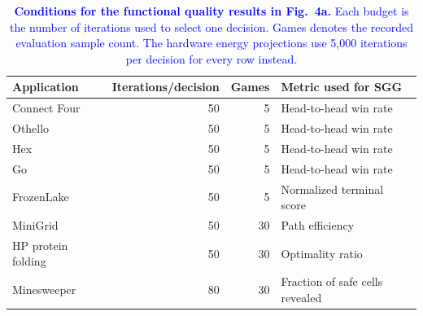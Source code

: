\begin{table}[!htbp]
\centering
\caption{\textcolor{blue}{\textbf{Conditions for the functional quality results in Fig.~4a.} Each budget is the number of iterations used to select one decision. Games denotes the recorded evaluation sample count. The hardware energy projections use 5{,}000 iterations per decision for every row instead.}}
\label{supp:application_protocol}
\begingroup\color{blue}\footnotesize
\begin{tabular}{l r r l}
\toprule
\textbf{Application} & \textbf{Iterations/decision} & \textbf{Games} & \textbf{Metric used for SGG} \\
\midrule
Connect Four & 50 & 5 & Head-to-head win rate \\
Othello & 50 & 5 & Head-to-head win rate \\
Hex & 50 & 5 & Head-to-head win rate \\
Go & 50 & 5 & Head-to-head win rate \\
FrozenLake & 50 & 5 & Normalized terminal score \\
MiniGrid & 50 & 30 & Path efficiency \\
HP protein folding & 50 & 30 & Optimality ratio \\
Minesweeper & 80 & 30 & Fraction of safe cells revealed \\
\bottomrule
\end{tabular}
\endgroup
\end{table}
